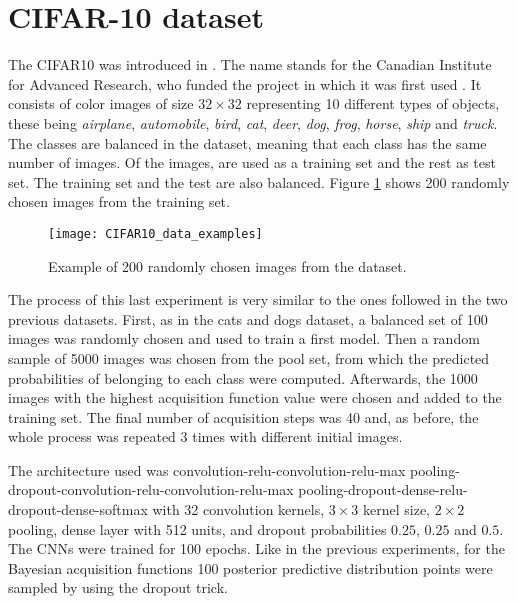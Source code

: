 \section{CIFAR-10 dataset}

The CIFAR10 was introduced in \citeyear{krizhevsky2009learning}. The name stands for the Canadian Institute for Advanced Research, who funded the project in which it was first used \cite{krizhevsky2009learning}. It consists of  color images of size $32 \times 32$ representing 10 different types of objects, these being \textit{airplane}, \textit{automobile}, \textit{bird}, \textit{cat}, \textit{deer}, \textit{dog}, \textit{frog}, \textit{horse}, \textit{ship} and \textit{truck}. The classes are balanced in the dataset, meaning that each class has the same number of images. Of the  images,  are used as a training set and the rest as test set. The training set and the test are also balanced. Figure \ref{fig:CIFAR10_data_examples} shows 200 randomly chosen images from the training set.

\begin{figure}[H]
    \centering
    \texttt{[image: CIFAR10\_data\_examples]}
    \caption{Example of 200 randomly chosen images from the dataset.}
    \label{fig:CIFAR10_data_examples}
\end{figure}

The process of this last experiment is very similar to the ones followed in the two previous datasets. First, as in the cats and dogs dataset, a balanced set of 100 images was randomly chosen and used to train a first model. Then a random sample of 5000 images was chosen from the pool set, from which the predicted probabilities of belonging to each class were computed. Afterwards, the 1000 images with the highest acquisition function value were chosen and added to the training set. The final number of acquisition steps was 40 and, as before, the whole process was repeated 3 times with different initial images.

The architecture used was convolution-relu-convolution-relu-max pooling-dropout-convolution-relu-convolution-relu-max pooling-dropout-dense-relu-dropout-dense-softmax with 32 convolution kernels, $3 \times 3$ kernel size, $2 \times 2$ pooling, dense layer with 512 units, and dropout probabilities $0.25$, $0.25$ and $0.5$. The CNNs were trained for 100 epochs. Like in the previous experiments, for the Bayesian acquisition functions 100 posterior predictive distribution points were sampled by using the dropout trick.

